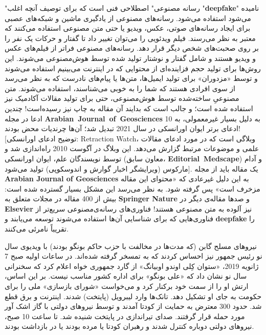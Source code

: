 "رسانه مصنوعی" اصطلاحی فنی است که برای توصیف آنچه اغلب "\textenglish{\textbf{deepfake}}" نامیده می‌شود استفاده می‌شود.
رسانه‌های مصنوعی از یادگیری ماشین و شبکه‌های عصبی برای ایجاد رسانه‌های صوتی، عکس، ویدیو یا حتی متن مصنوعی استفاده می‌کنند که معتبر به نظر می‌رسند.
فیلم ویدئویی را می‌توان تغییر داد تا گفتار و حرکات یک نفر را بر روی صحبت‌های شخص دیگر قرار دهد.
رسانه‌های مصنوعی فراتر از فیلم‌های عکس و ویدیو هستند و شامل گفتار و نوشتار تولید شده توسط هوش‌مصنوعی می‌شوند.
این روش‌ها برای تولید حجم فزاینده‌ای از محتوایی که در اینترنت می‌بینیم استفاده می‌شوند و توسط «مزدوران» برای تولید ایمیل‌ها، متن‌ها یا پیام‌های نادرست که به نظر می‌رسد از سوی افرادی هستند که شما را به خوبی می‌شناسند، استفاده می‌شوند.
متن مصنوعیِ ساخته‌شده توسط هوش‌مصنوعی، حتی برای تولید مقالات آکادمیک نیز استفاده شده است؛ و جالب است که بدایند آن مقاله به چاپ نیز رسیده‌است!
چندین ادعا در مجله \textenglish{\textbf{\mbox{Arabian Journal of Geosciences}}} به دلیل بسیار غیرمعمولی، به 10 ادعای برتر ایوان اورانسکی در سال 2021 تبدیل شد؛ آن‌ها چرندیات محض بودند!
[توضیح ادعای اورانسکی: Retraction Watch، وبلاگی است که در مورد ادعای مقالات علمی و موضوعات مرتبط گزارش می‌دهد.
این وبلاگ در آگوست 2010 راه‌اندازی شد و توسط نویسندگان علم، ایوان اورانسکی (معاون سابق، \textenglish{\textbf{\mbox{Editorial Medscape}}}) و آدام مارکوس (ویرایشگر اخبار گوارش و اندوسکوپی) تولید می‌شود].
یک مقاله باید از مجله \textenglish{\textbf{Arabian Journal of Geosciences}} به این دلیل غیرعادی که «محتوای این مقاله مزخرف است» پس گرفته شود.
به نظر می‌رسد این مشکل بسیار گسترده شده است: بیش از 400 مقاله در مجلات متعلق به \textenglish{\textbf{Springer Nature}} و صدها مقاله‌ی دیگر در \textenglish{\textbf{Elsevier}} نیز آلوده به متن مصنوعی هستند!
فناوری‌های رسانه‌ی‌مصنوعی سریع‌تر از فناوری‌هایی که برای شناسایی آن‌ها استفاده می‌شوند توسعه می‌یابند و \textenglish{\textbf{deepfake}} را تقریباً نامرئی می‌کنند.

نیروهای مسلح گابن (که مدت‌ها در مخالفت با حزب حاکم بونگو بودند) با ویدیوی سال نو رئیس جمهور نیز احساس کردند که به تمسخر گرفته شده‌اند.
در ساعات اولیه صبح 7 ژانویه 2019، «ستوان کِلی اوندو اوبیانگ» از گارد جمهوری خواه اعلام کرد که سخنرانی سال نو نشان داد که «علی بونگو» برای اداره کشور مناسب نیست.
بر این اساس، ارتش او را از سمت خود برکنار کرد و می‌خواست «شورای بازسازی» ملی را برای حکومت به جای او تشکیل دهد.
تانک‌ها وارد لیبرویل (پایتخت) شدند.
اینترنت و برق قطع شد.
حدود 300 معترض به حمایت از کودتا آمدند و توسط نیروهای دولتی با گاز اشک آور مورد حمله قرار گرفتند.
صدای تیراندازی در پایتخت شنیده شد.
تا ساعت 10 صبح، نیروهای دولتی دوباره کنترل شدند و رهبران کودتا یا مرده بودند یا در بازداشت بودند.

